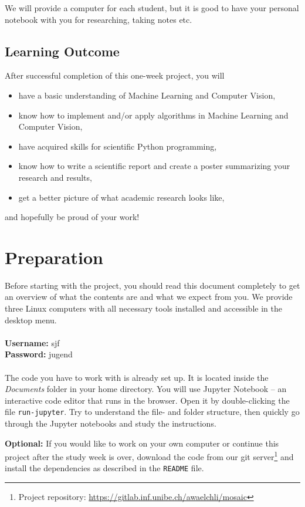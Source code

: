\documentclass[a4paper]{article}
\begin{document}
		We will provide a computer for each student, but it is good to have your personal notebook with you for researching, taking notes etc.
	
	\subsection{Learning Outcome}
		After successful completion of this one-week project, you will  %
		\begin{itemize}
			\item have a basic understanding of Machine Learning and Computer Vision,
			\item know how to implement and/or apply algorithms in Machine Learning and Computer Vision,
			\item have acquired skills for scientific Python programming,
			\item know how to write a scientific report and create a poster summarizing your research and results,
			\item get a better picture of what academic research looks like,
		\end{itemize}
		and hopefully be proud of your work!
	

\section{Preparation}
	Before starting with the project, you should read this document completely to get an overview of what the contents are and what we expect from you.
	We provide three Linux computers with all necessary tools installed and accessible in the desktop menu. 
	\\ \\
	\textbf{Username:} sjf\\
	\textbf{Password:} jugend
	\\ \\
	The code you have to work with is already set up.
	It is located inside the \emph{Documents} folder in your home directory. 
	You will use Jupyter Notebook -- an interactive code editor that runs in the browser. 
	Open it by double-clicking the file \verb|run-jupyter|. 
	Try to understand the file- and folder structure, then quickly go through the Jupyter notebooks and study the instructions.
	
	\textbf{Optional:}
	If you would like to work on your own computer or continue this project after the study week is over, download the code from our git server\footnote{Project repository: \url{https://gitlab.inf.unibe.ch/awaelchli/mosaic}} and install the dependencies as described in the \verb|README| file.
	
\end{document}
